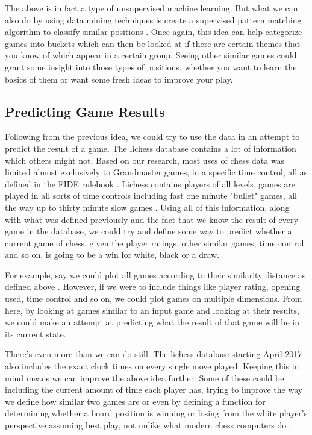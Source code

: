 \documentclass[12pt]{article}
\begin{document}
    The above is in fact a type of unsupervised machine learning. But what we can also do by using data mining techniques is create a supervised pattern matching algorithm to classify similar positions \cite{main}\cite{association}. Once again, this idea can help categorize games into buckets which can then be looked at if there are certain themes that you know of which appear in a certain group. Seeing other similar games could grant some insight into those types of positions, whether you want to learn the basics of them or want some fresh ideas to improve your play.

    \subsection{Predicting Game Results}

    Following from the previous idea, we could try to use the data in an attempt to predict the result of a game. The lichess database contains a lot of information which others might not. Based on our research, most uses of chess data was limited almost exclusively to Grandmaster games, in a specific time control, all as defined in the FIDE rulebook \cite{fiderules}. Lichess contains players of all levels, games are played in all sorts of time controls including fast one minute "bullet" games, all the way up to thirty minute slow games \cite{lichessdb}. Using all of this information, along with what was defined previously and the fact that we know the result of every game in the database, we could try and define some way to predict whether a current game of chess, given the player ratings, other similar games, time control and so on, is going to be a win for white, black or a draw.

    For example, say we could plot all games according to their similarity distance as defined above \cite{main}. However, if we were to include things like player rating, opening used, time control and so on, we could plot games on multiple dimensions. From here, by looking at games similar to an input game and looking at their results, we could make an attempt at predicting what the result of that game will be in its current state.

    There's even more than we can do still. The lichess database starting April 2017 also includes the exact clock times on every single move played. Keeping this in mind means we can improve the above idea further. Some of these could be including the current amount of time each player has, trying to improve the way we define how similar two games are or even by defining a function for determining whether a board position is winning or losing from the white player's perspective assuming best play, not unlike what modern chess computers do \cite{stockfish}. 
\end{document}
